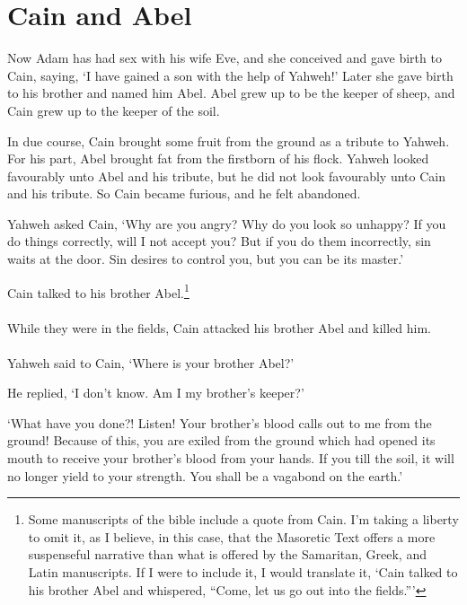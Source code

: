 \chapter{Cain and Abel}

Now Adam has had sex with his wife Eve,
and she conceived and gave birth to Cain, saying,
`I have gained a son with the help of Yahweh!'
Later she gave birth to his brother
and named him Abel.
Abel grew up to be the keeper of sheep, 
and Cain grew up to the keeper of the soil.

In due course, 
Cain brought some fruit from the ground 
as a tribute to Yahweh. 
For his part,
Abel brought fat from 
the firstborn of his flock.
Yahweh looked favourably unto Abel and his tribute,
but he did not look favourably unto Cain and his tribute.
So Cain became furious, and he felt abandoned.

Yahweh asked Cain,
`Why are you angry?
Why do you look so unhappy?
If you do things correctly,
will I not accept you?
But if you do them incorrectly,
sin waits at the door.
Sin desires to control you,
but you can be its master.'

Cain talked to his brother Abel.\footnote{
    Some manuscripts of the bible include a quote from Cain.
    I'm taking a liberty to omit it, as I believe, in this case,
    that the Masoretic Text offers a more suspenseful narrative
    than what is offered by 
    the Samaritan, Greek, and Latin manuscripts.
    If I were to include it, I would translate it, 
    `Cain talked to his brother Abel and whispered, 
    ``Come, let us go out into the fields.'''
}

\subsubsection{\secsep}

 While they were in the fields, 
Cain attacked his brother Abel and killed him.

\subsubsection{\secsep}

 Yahweh said to Cain,
`Where is your brother Abel?'

He replied,
`I don't know. 
Am I my brother's keeper?'

`What have you done?!
Listen!
Your brother's blood 
calls out to me from the ground!
Because of this, you are exiled from the ground 
which had opened its mouth
to receive your brother's blood 
from your hands.
If you till the soil,
it will no longer yield to your strength.
You shall be a vagabond on the earth.'

